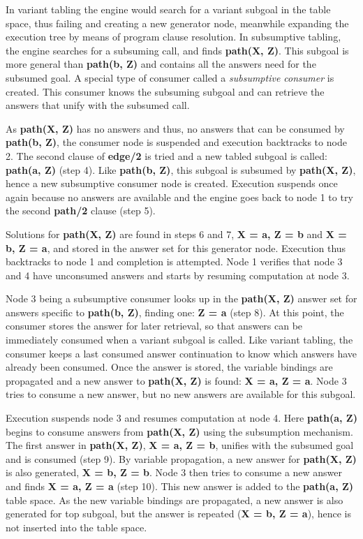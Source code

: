 In variant tabling the engine would search for a variant subgoal in the table space, thus failing and creating a new generator node,
meanwhile expanding the execution tree by means of program clause resolution. In subsumptive tabling, the engine searches for a subsuming call,
and finds \textbf{path(X, Z)}. This subgoal
is more general than \textbf{path(b, Z)} and contains all the answers need for the subsumed goal.
A special type of consumer called a \textit{subsumptive consumer} is created. This consumer knows the subsuming subgoal and can retrieve
the answers that unify with the subsumed call.

As \textbf{path(X, Z)} has no answers and thus, no answers that can be consumed by \textbf{path(b, Z)}, the consumer node is suspended
and execution backtracks to node 2. The second clause of \textbf{edge/2} is tried and a new tabled subgoal is called: \textbf{path(a, Z)} (step 4).
Like \textbf{path(b, Z)}, this subgoal is subsumed by \textbf{path(X, Z)}, hence a new subsumptive consumer node is created. Execution suspends
once again because no answers are available and the engine goes back to node 1 to try the second \textbf{path/2} clause (step 5).

Solutions for \textbf{path(X, Z)} are found in steps 6 and 7, \textbf{X = a, Z = b} and \textbf{X = b, Z = a}, and stored in the answer set
for this generator node. Execution thus backtracks to node 1 and completion is attempted. Node 1 verifies that node 3 and 4 have
unconsumed answers and starts by resuming computation at node 3.

Node 3 being a subsumptive consumer looks up in the \textbf{path(X, Z)}
answer set for answers specific to \textbf{path(b, Z)}, finding one: \textbf{Z = a} (step 8). At this point, the consumer stores the answer
for later retrieval, so that answers can be immediately consumed when a variant subgoal is called.
Like variant tabling, the consumer keeps a last consumed answer continuation to know which answers have already been consumed.
Once the answer is stored, the variable bindings are propagated and a new answer to \textbf{path(X, Z)} is found: \textbf{X = a, Z = a}.
Node 3 tries to consume a new answer, but no new answers are available for this subgoal.

Execution suspends node 3 and resumes computation at node 4. Here \textbf{path(a, Z)} begins to consume answers from \textbf{path(X, Z)}
using the subsumption mechanism. The first answer in \textbf{path(X, Z)}, \textbf{X = a, Z = b}, unifies with the subsumed goal and
is consumed (step 9). By variable propagation, a new answer for \textbf{path(X, Z)} is also generated, \textbf{X = b, Z = b}.
Node 3 then tries to consume a new answer and finds \textbf{X = a, Z = a} (step 10). This new answer
is added to the \textbf{path(a, Z)} table space. As the new variable bindings are propagated, a new answer is also generated
for top subgoal, but the answer is repeated (\textbf{X = b, Z = a}), hence is not inserted into the table space.

